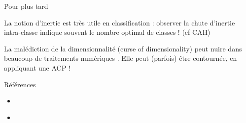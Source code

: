 \documentclass{beamer}
\begin{document}
\begin{frame}{Pour plus tard}


La notion d'\alert{inertie} est très utile en classification : observer la chute d'inertie intra-classe indique souvent le nombre optimal de classes ! (cf CAH)



La \alert{malédiction de la dimensionnalité} (curse of dimensionality) peut nuire dans beaucoup de traitements numériques . Elle peut (parfois) être contournée, en appliquant une ACP !




\end{frame}




\begin{frame}{Références }


\begin{itemize}
\item \href{http://www.sthda.com/french/articles/38-methodes-des-composantes-principales-dans-r-guide-pratique/73-acp-analyse-en-composantes-principales-avec-r-l-essentiel}{\color{cyan}{Page ACP STDHA}}
\item \href{https://gitlab.huma-num.fr/hcommenges/cours_statcomplet}{\color{cyan}{Cours d'Hadrien Commenges}}
\end{itemize}


\end{frame}

\end{document}
